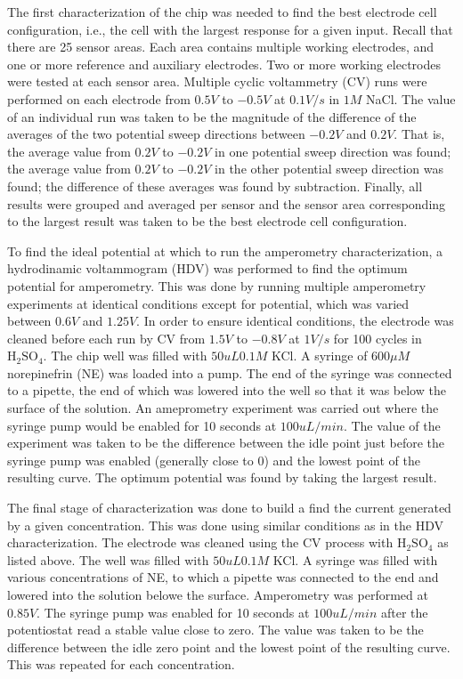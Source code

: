 \documentclass[twocolumn]{article}
\begin{document}
The first characterization of the chip was needed to find the best electrode cell configuration, i.e., the cell with the largest response for a given input. Recall that there are 25 sensor areas. Each area contains multiple working electrodes, and one or more reference and auxiliary electrodes. Two or more working electrodes were tested at each sensor area. Multiple cyclic voltammetry (CV) runs were performed on each electrode from $0.5V$ to $-0.5V$ at $0.1V/s$ in $1 M$ NaCl. The value of an individual run was taken to be the magnitude of the difference of the averages of the two potential sweep directions between $-0.2V$ and $0.2V$. That is, the average value from $0.2V$ to $-0.2V$ in one potential sweep direction was found; the average value from $0.2V$ to $-0.2V$ in the other potential sweep direction was found; the difference of these averages was found by subtraction. Finally, all results were grouped and averaged per sensor and the sensor area corresponding to the largest result was taken to be the best electrode cell configuration.

To find the ideal potential at which to run the amperometry characterization, a hydrodinamic voltammogram (HDV) was performed to find the optimum potential for amperometry. This was done by running multiple amperometry experiments at identical conditions except for potential, which was varied between $0.6V$ and $1.25V$. In order to ensure identical conditions, the electrode was cleaned before each run by CV from $1.5V$ to $-0.8V$ at $1V/s$ for 100 cycles in $\mathrm{H}_2 \mathrm{SO}_4$. The chip well was filled with $50uL 0.1M$ KCl. A syringe of $600\mu M$ norepinefrin (NE) was loaded into a pump. The end of the syringe was connected to a pipette, the end of which was lowered into the well so that it was below the surface of the solution. An ameprometry experiment was carried out where the syringe pump would be enabled for 10 seconds at $100uL/min$. The value of the experiment was taken to be the difference between the idle point just before the syringe pump was enabled (generally close to 0) and the lowest point of the resulting curve. The optimum potential was found by taking the largest result.

The final stage of characterization was done to build a find the current generated by a given concentration. This was done using similar conditions as in the HDV characterization. The electrode was cleaned using the CV process with $\mathrm{H}_2 \mathrm{SO}_4$ as listed above. The well was filled with $50uL 0.1M$ KCl. A syringe was filled with various concentrations of NE, to which a pipette was connected to the end and lowered into the solution belowe the surface. Amperometry was performed at $0.85V$. The syringe pump was enabled for 10 seconds at $100uL/min$ after the potentiostat read a stable value close to zero. The value was taken to be the difference between the idle zero point and the lowest point of the resulting curve. This was repeated for each concentration.
\end{document}
